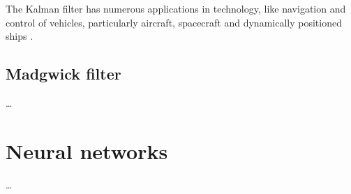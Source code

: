 The Kalman filter has numerous applications in technology, like navigation and control of vehicles, particularly aircraft, spacecraft and dynamically positioned ships \cite{WikipediaKalman}.

\subsection{Madgwick filter} \label{Madgwick filter}
\dots

\section{Neural networks}
\dots

